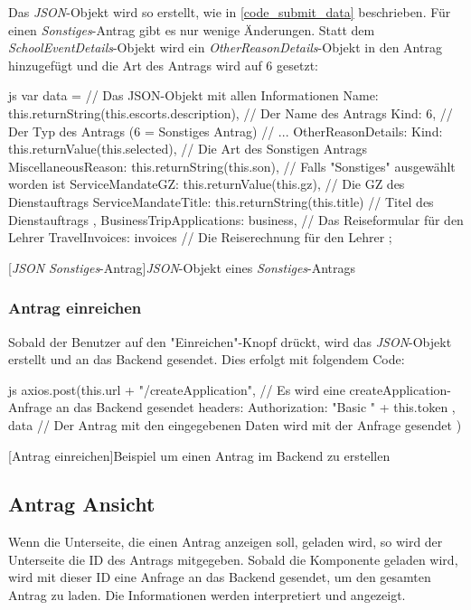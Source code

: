 Das \textit{JSON}-Objekt wird so erstellt, wie in \autoref{code_submit_data} beschrieben. Für einen \textit{Sonstiges}-Antrag gibt es nur wenige Änderungen.
Statt dem \textit{SchoolEventDetails}-Objekt wird ein \textit{OtherReasonDetails}-Objekt in den Antrag hinzugefügt und die Art des Antrags wird auf 6 gesetzt:
\begin{code}{js}
var data = {		// Das JSON-Objekt mit allen Informationen
	Name: this.returnString(this.escorts.description),	// Der Name des Antrags
	Kind: 6,	// Der Typ des Antrags (6 = Sonstiges Antrag)
	// ...
	OtherReasonDetails: {
		Kind: this.returnValue(this.selected),	// Die Art des Sonstigen Antrags
		MiscellaneousReason: this.returnString(this.son),	// Falls "Sonstiges" ausgewählt worden ist
		ServiceMandateGZ: this.returnValue(this.gz),	// Die GZ des Dienstauftrags
		ServiceMandateTitle: this.returnString(this.title)	// Titel des Dienstauftrags
	},
	BusinessTripApplications: business,	// Das Reiseformular für den Lehrer
	TravelInvoices: invoices	// Die Reiserechnung für den Lehrer
};
\end{code}
[\textit{JSON} \textit{Sonstiges}-Antrag]{\textit{JSON}-Objekt eines \textit{Sonstiges}-Antrags}~\\
\subsubsection{Antrag einreichen}
Sobald der Benutzer auf den "Einreichen"-Knopf drückt, wird das \textit{JSON}-Objekt erstellt und an das Backend gesendet. Dies erfolgt mit folgendem Code:
\begin{code}{js}
	axios.post(this.url + "/createApplication", // Es wird eine createApplication-Anfrage an das Backend gesendet
	{
		headers: {
			Authorization: "Basic " + this.token
		}
	},
	data // Der Antrag mit den eingegebenen Daten wird mit der Anfrage gesendet
	)
\end{code}
[Antrag einreichen]{Beispiel um einen Antrag im Backend zu erstellen}~\\
\newpage
\subsection{Antrag Ansicht}
\label{sec:antrag_ansicht}
Wenn die Unterseite, die einen Antrag anzeigen soll, geladen wird, so wird der Unterseite die ID des Antrags mitgegeben. Sobald die Komponente geladen wird, wird mit dieser ID eine Anfrage an das Backend gesendet, um den gesamten Antrag zu laden. Die Informationen werden interpretiert und angezeigt.
